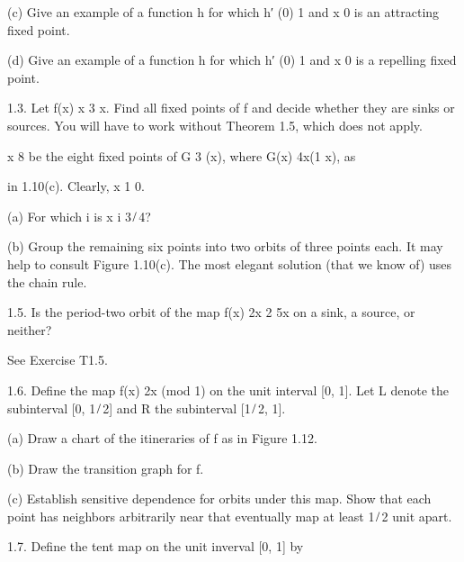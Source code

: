 (c) Give an example of a function h for which h′ (0)  1 and x  0 is an attracting ﬁxed point.

(d) Give an example of a function h for which h′ (0)  1 and x  0 is a repelling ﬁxed point.

1.3. Let f(x)  x 3 x. Find all ﬁxed points of f and decide whether they are sinks or sources. You will 
have to work without Theorem 1.5, which does not apply.

  x 8 be the eight ﬁxed points of G 3 (x), where G(x)  4x(1  x), as

in 1.10(c). Clearly, x 1  0.

(a) For which i is x i  3 ̸ 4?

(b) Group the remaining six points into two orbits of three points each. It may help to consult Figure 
1.10(c). The most elegant solution (that we know of) uses the chain rule.

1.5. Is the period-two orbit of the map f(x)  2x 2  5x on a sink, a source, or neither?

See Exercise T1.5.

1.6. Deﬁne the map f(x)  2x (mod 1) on the unit interval [0, 1]. Let L denote the subinterval [0, 1 ̸ 2] 
and R the subinterval [1 ̸ 2, 1].

(a) Draw a chart of the itineraries of f as in Figure 1.12.

(b) Draw the transition graph for f.

(c) Establish sensitive dependence for orbits under this map. Show that each point has neighbors 
arbitrarily near that eventually map at least 1 ̸ 2 unit apart.

1.7. Deﬁne the tent map on the unit inverval [0, 1] by

